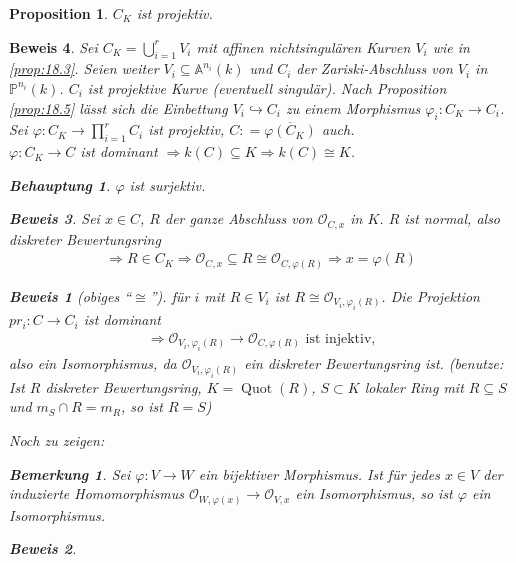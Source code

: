 \documentclass[a4paper,12pt]{report}
\theoremstyle{break}
\newtheorem{Bem}[Def]{Bemerkung}
\newtheorem{Prop}[Def]{Proposition}
\theoremstyle{nonumberbreak}
\newtheorem{Beh}{Behauptung}
\theoremstyle{nonumberplain}
\newtheorem{Bew}{Beweis}
\newcommand{\defeqr}[0]{\mathrel{\mathop:}=}
\DeclareMathOperator{\Quot}{Quot}
\begin{document}
\begin{Prop}
  \label{prop:18.4}
  $C_K$ ist projektiv.
\end{Prop}
\begin{Bew}
  Sei $C_K=\bigcup_{i=1}^rV_i$ mit affinen nichtsingulären Kurven $V_i$ wie in \ref{prop:18.3}. Seien weiter $V_i\subseteq\mathbb A^{n_i}(k)$ 
  und $C_i$ der Zariski-Abschluss von $V_i$ in $\mathbb P^{n_i}(k)$. $C_i$ ist projektive Kurve (eventuell singulär). 
  Nach Proposition \ref{prop:18.5} lässt sich die Einbettung $V_i\hookrightarrow C_i$ zu einem Morphismus $\varphi_i:C_K\longrightarrow C_i$. \\
  Sei $\varphi:C_K\longrightarrow\prod_{i=1}^rC_i$ ist projektiv, $C\defeqr\overline{\varphi(C_K)}$ auch. \\
  $\varphi:C_K\longrightarrow C$ ist dominant $\Rightarrow k(C)\subseteq K\Rightarrow k(C)\cong K$.
  \begin{Beh}
    $\varphi$ ist surjektiv.
  \end{Beh}
  \begin{Bew}
    Sei $x\in C$, $R$ der ganze Abschluss von $\mathcal O_{C,x}$ in $K$. $R$ ist normal, also diskreter Bewertungsring
    \begin{align*}
      \Rightarrow R\in C_K \Rightarrow \mathcal O_{C,x}\subseteq R\cong \mathcal O_{C,\varphi(R)}\Rightarrow x=\varphi(R)
    \end{align*}
    \begin{Bew}[obiges ``$\cong$'']
      für $i$ mit $R\in V_i$ ist $R\cong \mathcal O_{V_i,\varphi_i(R)}$. Die Projektion $pr_i:C\longrightarrow C_i$ ist dominant
      \begin{align*}
        \Rightarrow \mathcal O_{V_i,\varphi_i(R)}\longrightarrow\mathcal O_{C,\varphi(R)}\text{ ist injektiv,}
      \end{align*}
      also ein Isomorphismus, da $\mathcal O_{V_i,\varphi_i(R)}$ ein diskreter Bewertungsring ist. 
      (benutze: Ist $R$ diskreter Bewertungsring, $K=\Quot(R)$, $S\subset K$ lokaler Ring mit $R\subseteq S$
      und $m_S\cap R=m_R$, so ist $R=S$)
    \end{Bew}
    Noch zu zeigen:
    \begin{Bem}
      \label{bem:18.6}
      Sei $\varphi:V\longrightarrow W$ ein bijektiver Morphismus. Ist für jedes $x\in V$ der induzierte Homomorphismus
      $\mathcal O_{W,\varphi(x)}\longrightarrow \mathcal O_{V,x}$ ein Isomorphismus, so ist $\varphi$ ein Isomorphismus.
    \end{Bem}
    \begin{Bew}

\end{Bew}
\end{Bew}
\end{Bew}
\end{document}
